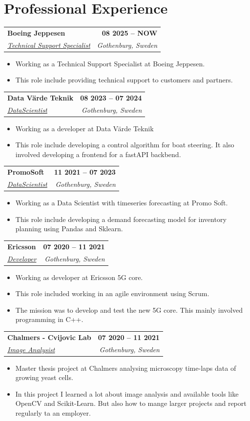 \documentclass[letterpaper,11pt]{article}
\makeatletter
\newcommand{\entry}[5][]{%
  \begin{tabular*}{\textwidth}[t]{@{}l@{\extracolsep{\fill}}r@{}}
    {\large\bfseries #2} & {\small\bfseries #3}\\
    {\large\itshape #1#4} & {\small\itshape #5}\\
  \end{tabular*}\par\vspace{1.6pt}}
\newenvironment{bullets}{\begin{itemize}[leftmargin=24.1pt,labelsep=5.47pt,label=$\vcenter{\hbox{\tiny$\bullet$}}$,topsep=0pt,itemsep=0pt,parsep=0pt,partopsep=0pt]}{\end{itemize}\vspace{3.5pt}}
\makeatother
\begin{document}
\section{Professional Experience}
\entry{Boeing Jeppesen}{08 2025 -- NOW}{\underline{Technical Support Specialist}}{Gothenburg, Sweden}
\begin{bullets}
  \item Working as a Technical Support Specialist at Boeing Jeppesen.
  \item This role include providing technical support to customers and partners.
\end{bullets}
\entry{Data Värde Teknik}{08 2023 -- 07 2024}{\underline{DataScientist}}{Gothenburg, Sweden}
\begin{bullets}
  \item Working as a developer at Data Värde Teknik
  \item This role include developing a control algorithm for boat steering. It also involved developing a frontend for a fastAPI backbend.
\end{bullets}
\entry{PromoSoft}{11 2021 -- 07 2023}{\underline{DataScientist}}{Gothenburg, Sweden}
\begin{bullets}
  \item Working as a Data Scientist with timeseries forecasting at Promo Soft.
  \item This role include developing a demand forecasting model for inventory planning using Pandas and Sklearn.
\end{bullets}
\entry{Ericsson}{07 2020 -- 11 2021}{\underline{Developer}}{Gothenburg, Sweden}
\begin{bullets}
  \item Working as developer at Ericsson 5G core.
  \item This role included working in an agile environment using Scrum.
  \item The mission was to develop and test the new 5G core. This mainly involved programming in C++.
\end{bullets}
\entry{Chalmers - Cvijovic Lab}{07 2020 -- 11 2021}{\underline{Image Analysist}}{Gothenburg, Sweden}
\begin{bullets}
  \item Master thesis project at Chalmers analysing microscopy time-laps data of growing yeast cells.
  \item In this project I learned a lot about image analysis and available tools like OpenCV and Scikit-Learn. But also how to mange larger projects and report regularly ta an employer.
\end{bullets}
\end{document}
